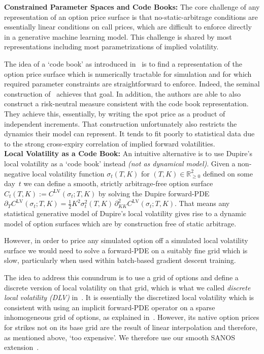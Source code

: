 \documentclass[11pt,a4paper]{article}
\newcommand{\R}{\mathbb{R}}
\begin{document}
\noindent
\textbf{Constrained Parameter Spaces and Code Books:}
The core challenge of any representation of an option price surface is that no-static-arbitrage conditions are essentially
linear conditions on call prices, which are difficult to enforce directly in a generative machine learning model. 
This challenge is shared by most representations including most parametrizations of implied volatility.

The idea of a `code book' as introduced in~\citet{TangentLevy} is to find a representation of the option price surface
which is numerically tractable for simulation and for which required parameter constraints are straightforward to enforce.
Indeed, the seminal construction of~\citet{TangentLevy} achieves that goal. In addition, the authors are able to also
construct a risk-neutral measure consistent with the code book representation.
They achieve this, essentially, by writing the spot price as a product of independent increments. That construction unfortunately also restricts
the dynamics their model can represent. It tends to fit poorly to statistical data due to the strong cross-expiry correlation of implied forward volatilities.
\\

\noindent
\textbf{Local Volatility as a Code Book:}
An intuitive alternative is to use Dupire's local volatility as a `code book' instead
\emph{(not as dynamical model)}. Given a non-negative local volatility function
$\sigma_t(T,K)$ for $(T,K)\in\R^2_{\geq 0}$ defined on some day~$t$
we can define 
a smooth, strictly arbitrage-free option surface 
$C_t(T,K):=C^\mathrm{LV}(\sigma_t;T,K)$ 
by solving the Dupire forward-PDE
$\partial_T C^\mathrm{LV}(\sigma_t;T,K)
 = \mbox{$\frac12$}K^2\sigma_t^2(T,K)\,
   \partial^2_{KK}C^\mathrm{LV}(\sigma_t;T,K)$.
That means any statistical generative model of Dupire's local volatility gives rise
to a dynamic model of option surfaces which are by construction free of static arbitrage.

However, in order to price any simulated option off a simulated local volatility surface
we would need to solve a forward-PDE on a suitably
fine grid which is slow, particularly when used within batch-based gradient descent training.

The idea to address this conundrum is to use a grid of options and define a discrete version
of local volatility on that grid, which is what we called
\emph{discrete local volatility (DLV)} in~\citet{DLV}.
It is essentially the discretized local volatility which is consistent with using an implicit forward-PDE operator on a sparse inhomogeneous grid of options,
as explained in~\citet{AndreasenHuge}.
However,
its native option prices for strikes not on its base grid are the result of linear interpolation and therefore, as mentioned above, `too expensive'.
We therefore use
our smooth SANOS extension~\citep{SANOS2026}.
\end{document}
